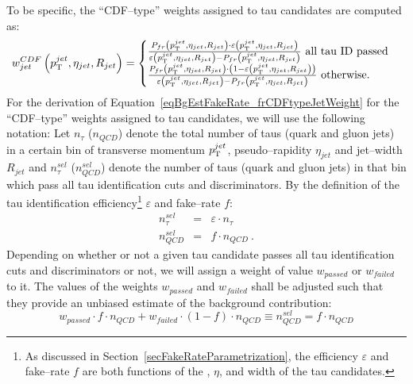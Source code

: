 To be specific, the ``CDF--type'' weights assigned to tau candidates are
computed as:
\begin{equation}
w_{jet}^{CDF} \left( p_{\mathrm{T}}^{jet}, \eta_{jet}, R_{jet} \right) 
= 
\begin{cases} 
   \frac{P_{fr} \left( p_{\mathrm{T}}^{jet}, \eta_{jet}, R_{jet} \right) \cdot 
         \varepsilon \left( p_{\mathrm{T}}^{jet}, \eta_{jet}, R_{jet} \right)}
        {\varepsilon \left( p_{\mathrm{T}}^{jet}, \eta_{jet}, R_{jet} \right) - P_{fr} \left( p_{\mathrm{T}}^{jet}, \eta_{jet}, R_{jet} \right)}~\mbox{all tau ID passed} \\
   \frac{P_{fr} \left( p_{\mathrm{T}}^{jet}, \eta_{jet}, R_{jet} \right) \cdot 
         \left( 1 - \varepsilon \left( p_{\mathrm{T}}^{jet}, \eta_{jet}, R_{jet} \right) \right)}
        {\varepsilon \left( p_{\mathrm{T}}^{jet}, \eta_{jet}, R_{jet} \right) - P_{fr}
        \left( p_{\mathrm{T}}^{jet}, \eta_{jet}, R_{jet} \right)}~\mbox{otherwise.}
\end{cases}
\label{eqBgEstFakeRate_frCDFtypeJetWeight}
\end{equation}
For the derivation of Equation~\ref{eqBgEstFakeRate_frCDFtypeJetWeight} for the
``CDF--type'' weights assigned to tau candidates, we will use the following
notation: Let $n_{\tau}$ ($n_{QCD}$) denote the total number of taus (quark and
gluon jets) in a certain bin of transverse momentum $p_{\mathrm{T}}^{jet}$,
pseudo--rapidity $\eta_{jet}$ and jet--width $R_{jet}$ and $n_{\tau}^{sel}$
($n_{QCD}^{sel}$) denote the number of taus (quark and gluon jets) in that bin
which pass all tau identification cuts and discriminators.  By the definition of
the tau identification efficiency\footnote{As discussed in
Section~\ref{secFakeRateParametrization}, the efficiency $\varepsilon$ and
fake--rate $f$ are both functions of the \pt, $\eta$, and width of the tau
candidates.} $\varepsilon$ and fake--rate $f$:
\begin{eqnarray}
n_{\tau}^{sel} & = & \varepsilon \cdot n_{\tau} \nonumber \\
n_{QCD}^{sel} & = & f \cdot n_{QCD}~.
\label{eqBgEstFakeRate_eff_and_frDef}
\end{eqnarray}
Depending on whether or not a given tau candidate passes all tau
identification cuts and discriminators or not, we will assign a weight of value
$w_{passed}$ or $w_{failed}$ to it.
The values of the weights $w_{passed}$ and $w_{failed}$ shall be adjusted such
that they provide an unbiased estimate of the background contribution:
\begin{equation}
w_{passed} \cdot f \cdot n_{QCD} + w_{failed} \cdot \left( 1 - f \right) \cdot n_{QCD} \equiv n_{QCD}^{sel} = f \cdot n_{QCD}
\label{eqBgEstFakeRate_QCD}
\end{equation}
